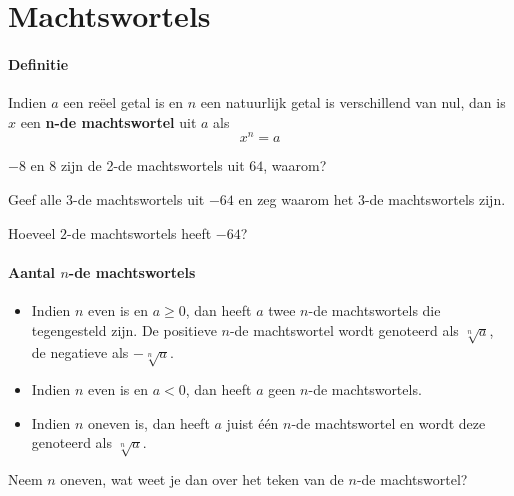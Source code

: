 \documentclass[12pt,twoside]{article}
\begin{document}
\section{Machtswortels}

\paragraph*{Definitie}
\begin{mdframed}
Indien $a$ een reëel getal is en $n$ een natuurlijk getal is verschillend van nul, dan is $x$ een {\bf n-de machtswortel} uit $a$ als
$$x^n=a$$
\end{mdframed}

\begin{oefening}
$-8$ en $8$ zijn de 2-de machtswortels uit $64$, waarom?
\end{oefening}

\begin{oefening}
Geef alle $3$-de machtswortels uit $-64$ en zeg waarom het $3$-de machtswortels zijn.
\end{oefening}

\begin{oefening}
Hoeveel $2$-de machtswortels heeft $-64$?
\end{oefening}

\paragraph*{Aantal $n$-de machtswortels}
\begin{mdframed}
\begin{itemize}
  \item Indien $n$ even is en $a\geq 0$, dan heeft $a$ twee $n$-de machtswortels die tegengesteld zijn. De positieve $n$-de machtswortel wordt genoteerd als $\sqrt[n]{a}$, de negatieve als $-\sqrt[n]{a}$.
  \item Indien $n$ even is en $a < 0$, dan heeft $a$ geen $n$-de machtswortels.
  \item Indien $n$ oneven is, dan heeft $a$ juist één $n$-de machtswortel en wordt deze genoteerd als $\sqrt[n]{a}$.
\end{itemize}
\end{mdframed}

\begin{oefening}
Neem $n$ oneven, wat weet je dan over het teken van de $n$-de machtswortel?
\end{oefening}
\end{document}

